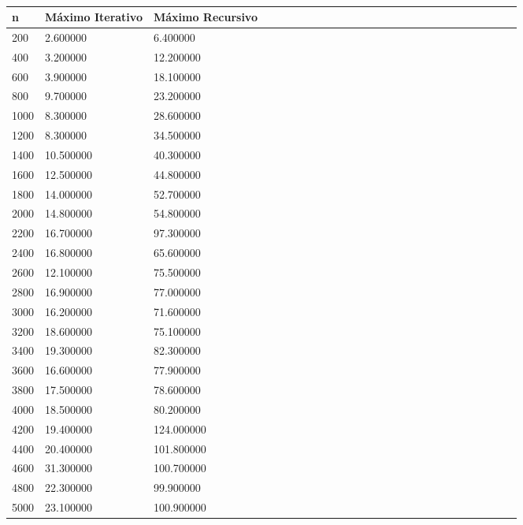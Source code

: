 \begin{table}[!ht]
\centering
\begin{tabular}{|l|l|l|l|l|l|l|l|l|l|l|l|l|l|l|l|l|l|l|l|l|l|l|l|l|l|}\hline
\textbf{n}&\textbf{Máximo Iterativo}&\textbf{Máximo Recursivo}\\\hline
200&2.600000&6.400000\\\hline
400&3.200000&12.200000\\\hline
600&3.900000&18.100000\\\hline
800&9.700000&23.200000\\\hline
1000&8.300000&28.600000\\\hline
1200&8.300000&34.500000\\\hline
1400&10.500000&40.300000\\\hline
1600&12.500000&44.800000\\\hline
1800&14.000000&52.700000\\\hline
2000&14.800000&54.800000\\\hline
2200&16.700000&97.300000\\\hline
2400&16.800000&65.600000\\\hline
2600&12.100000&75.500000\\\hline
2800&16.900000&77.000000\\\hline
3000&16.200000&71.600000\\\hline
3200&18.600000&75.100000\\\hline
3400&19.300000&82.300000\\\hline
3600&16.600000&77.900000\\\hline
3800&17.500000&78.600000\\\hline
4000&18.500000&80.200000\\\hline
4200&19.400000&124.000000\\\hline
4400&20.400000&101.800000\\\hline
4600&31.300000&100.700000\\\hline
4800&22.300000&99.900000\\\hline
5000&23.100000&100.900000\\\hline
\end{tabular}
\caption{}
\end{table}